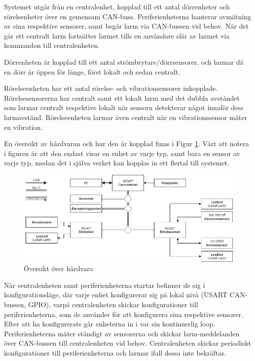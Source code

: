 \documentclass{article}
\begin{document}
Systemet utgår från en centralenhet, kopplad till ett antal dörrenheter och rörelsenheter över en gemensam CAN-buss. Periferienheterna hanterar avmätning av sina respektive sensorer, samt begär larm via CAN-bussen vid behov. När det går ett centralt larm fortsätter larmet tills en användare slår av larmet via kommandon till centralenheten.

Dörrenheten är kopplad till ett antal strömbrytare/dörrsensorer, och larmar då en dörr är öppen för länge, först lokalt och sedan centralt.

Rörelseenheten har ett antal rörelse- och vibrationsensorer inkopplade. Rörelsesensorerna har centralt samt ett lokalt larm med det dubbla avståndet 
som larmar centralt respektive lokalt när sensorn detekterar något innaför dess larmavstånd.
Rörelseenheten larmar även centralt när en vibrationssensor mäter en vibration.

En översikt av hårdvaran och hur den är kopplad finns i Figur \ref{fig:hårdvara}. Värt att notera i figuren är att den endast visar en enhet av varje typ, samt bara en sensor av varje typ, medan det i själva verket kan kopplas in ett flertal till systemet.
\begin{figure}[H] %
    \centering
    \includegraphics[width=1\textwidth]{figurer/HardvaraOversikt.png}
    \caption{Översikt över hårdvara}
    \label{fig:hårdvara}
\end{figure}

När centralenheten samt periferienheterna startar befinner de sig i konfigurationsläge, där varje enhet konfigurerar sig på lokal nivå (USART CAN-bussen, GPIO), varpå centralenheten skickar konfigurationer till periferienheterna, som de använder för att konfigurera sina respektive sensorer.
Efter att ha konfigurerats går enheterna in i var sin kontinuerlig loop. Periferienheterna mäter ständigt av sensorerna och skickar larm-meddelanden över CAN-bussen till centralenheten vid behov. Centralenheten skickar periodiskt konfigurationer till periferienheterna och larmar ifall dessa inte bekräftas.
\end{document}

